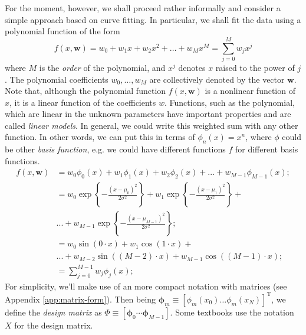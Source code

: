 \documentclass{article} %
\begin{document}
For the moment, however, we shall proceed rather informally and consider a simple approach based on curve fitting. In particular, we shall fit the data using a polynomial function of the form
%
\begin{equation}
      f(x, \mathbf{w})=w_{0}+w_{1} x+w_{2} x^{2}+\ldots+w_{M} x^{M}=\sum_{j=0}^{M} w_{j} x^{j}
      \label{eq:intro-poly}
\end{equation}
%
where $M$ is the \textit{order} of the polynomial, and $x^j$ denotes $x$ raised to the power of $j$. The polynomial coefficients $w_0, \dots , w_M$ are collectively denoted by the vector $\mathbf{w}$. Note that, although the polynomial function $f(x, \mathbf{w})$ is a nonlinear function of $x$, it is a linear function of the coefficients $w$. Functions, such as the polynomial, which are linear in the unknown parameters have important properties and are called \textit{linear models}. In general, we could write this weighted sum with any other function. In other words, we can put this in terms of $\phi_n(x)=x^n$, where $\phi$ could be other \textit{basis function}, e.g. we could have different functions $f$ for different basis functions.
%
\begin{align*}
      f(x,\mathbf{w}) &= w_0 \phi_0(x) +w_1 \phi_1(x) +w_2 \phi_2(x)  + ... + w_{M-1} \phi_{M-1}(x); \\
                        &= w_0 \exp\left\{ - \frac{(x-\mu_0)^2}{2\sigma^2}\right\} + w_1  \exp\left\{ - \frac{(x-\mu_1)^2}{2\sigma^2}\right\} + \\ & ... + w_{M-1} \exp\left\{ - \frac{(x-\mu_{M-1})^2}{2\sigma^2}\right\}; \\
                        &= w_0 \sin(0 \cdot x) + w_1 \cos(1 \cdot x) + \\ &... + w_{M-2} \sin((M-2) \cdot x) + w_{M-1} \cos((M-1) \cdot x); \\
                        &=\sum_{j=0}^{M-1} w_{j} \phi_{j}(x);
\end{align*}
%
For simplicity, we'll make use of an more compact notation with matrices (see Appendix \ref{app:matrix-form}). Then being $\boldsymbol{\phi}_m \equiv \left[  \phi_m(x_0) \dots \phi_m(x_N) \right]^{\mathrm{T}}$, we define the \textit{design matrix} as $\Phi \equiv \left[ \boldsymbol{\phi}_0 \cdots \boldsymbol{\phi}_{M-1} \right]$. Some textbooks use the notation $\mathit{X}$ for the design matrix.
\end{document}
